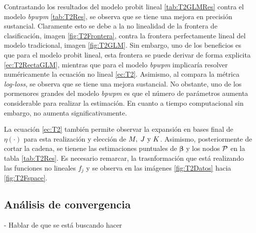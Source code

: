 \documentclass[../Main/Main.tex]{subfiles}
\begin{document}
Contrastando los resultados del modelo probit lineal \ref{tab:T2GLMRes} contra el modelo \textit{bpwpm} \ref{tab:T2Res}, se observa que se tiene una mejora en precisión sustancial. Claramente esto se debe a la no linealidad de la frontera de clasificación, imagen \ref{fig:T2Frontera}, contra la frontera perfectamente lineal del modelo tradicional, imagen \ref{fig:T2GLM}. Sin embargo, uno de los beneficios es que para el modelo probit lineal, esta frontera se puede derivar de forma explicita \eqref{ec:T2RectaGLM}, mientras que para el modelo \textit{bpwpm} implicaría resolver numéricamente la ecuación no lineal \eqref{ec:T2}. Asimismo, al compara la métrica \textit{log-loss}, se observa que se tiene una mejora sustancial. No obstante, uno de los pormenores grandes del modelo \textit{bpwpm} es que el número de parámetros aumenta considerable para realizar la estimación. En cuanto a tiempo computacional sin embargo, no aumenta significativamente. 

La ecuación \eqref{ec:T2} también permite observar la expansión en bases final de $\eta(\cdot)$ para esta realización y elección de $\MJK$. Asimismo, posteriormente de cortar la cadena, se tienene las estimaciones puntuales de $\bm{\beta}$ y los nodos $\P$ en la tabla \ref{tab:T2Res}. Es necesario remarcar, la trasnformación que está realizando las funciones no lineales $f_j$ y se observa en las imágenes \ref{fig:T2Datos} hacia \ref{fig:T2Fspace}. 


\subsection{Análisis de convergencia} \label{sec:AnalisisConv}

- Hablar de que se está buscando hacer 
\end{document}
